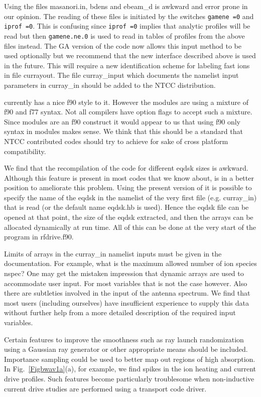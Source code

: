   Using the  files masanori.in, bdens
  and ebeam\_d is awkward and error prone in our opinion.  The reading
  of these files is initiated by the switches \texttt{gamene =0} and
 \texttt{iprof =0}. This is confusing since \texttt{iprof =0} implies that 
 analytic profiles will be read but then \texttt{gamene.ne.0} is used to
 read in tables of profiles from the above files instead.  
  The GA version of the
  code now allows this input method to be used  optionally but we
  recommend that the new \ot interface described above is used in the
  future. This will require a new identification scheme for labeling
  fast ions in file currayout. The file curray\_input which documents the namelist input
 parameters in curray\_in should be added to the NTCC distribution.

 \ct currently has a nice f90 style to it. However the modules
  are using a mixture of f90 and f77 syntax. Not all compilers have
  option flags to accept such a mixture. Since modules are an f90
  construct it would appear to us that using f90 only syntax in
  modules makes sense. We think that this should be a standard
 that NTCC contributed codes should try to achieve for sake of cross
 platform compatibility.

  We find that the recompilation of the code for different eqdsk sizes
  is awkward. Although this feature is present in most codes that we
  know about, \ct is in a better position to ameliorate this
  problem. Using the present version of \ct it is possible to 
  specify the name of the eqdsk in the namelist of the very first file 
  (e.g. curray\_in) that is read (or the default name eqdsk.hb is used).
  Hence the eqdsk file can be opened
 at that point, the size of the eqdsk extracted, and then the
 arrays can be allocated dynamically at run time. All of this
 can be done at the very start of the program in rfdrive.f90.


 Limits of arrays in the curray\_in namelist inputs must be given
in the documentation. For example, what is the maximum allowed number
of ion species nspec? One may get the mistaken impression that dynamic
arrays are used to accommodate user input. For most variables that is
not the case however. Also there are subtleties involved in the input of the
antenna spectrum. We find that most users (including ourselves) have insufficient
experience to supply this data without further help from  a more
detailed description of the required input variables.

 Certain
features to improve the smoothness such as ray launch randomization using a  Gaussian 
ray generator or other appropriate means should be
included. Importance sampling could be used to better map out regions
of high absorption. In Fig.~\ref{Figbwav1a}(a), for example, we find
spikes in the ion heating and current drive profiles. Such features
become particularly troublesome when non-inductive current drive
studies are performed using a transport code driver.
  
